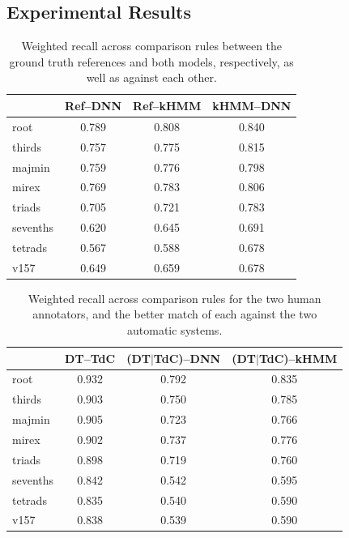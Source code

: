 \documentclass{article}
\begin{document}
\subsection{Experimental Results}
\label{subsec:experiment}

\begin{table}[!t]
\small
\centering
\begin{tabular}{l||ccc}
          & Ref--DNN & Ref--kHMM & kHMM--DNN \\
\hline
root      & 0.789      & 0.808       & 0.840       \\
thirds    & 0.757      & 0.775       & 0.815       \\
majmin    & 0.759      & 0.776       & 0.798       \\
mirex     & 0.769      & 0.783       & 0.806       \\
triads    & 0.705      & 0.721       & 0.783       \\
sevenths  & 0.620      & 0.645       & 0.691       \\
tetrads   & 0.567      & 0.588       & 0.678       \\
v157      & 0.649      & 0.659       & 0.678       \\
\hline
\end{tabular}
\caption{Weighted recall across comparison rules between the ground truth references and both models, respectively, as well as against each other.}
\label{tab:test_performance}
\end{table}

\begin{table}[!t]
\small
\centering
\begin{tabular}{l||ccc}
            & DT--TdC & (DT$|$TdC)--DNN & (DT$|$TdC)--kHMM \\
\hline
root        & 0.932 & 0.792 & 0.835 \\
thirds      & 0.903 & 0.750 & 0.785 \\
majmin      & 0.905 & 0.723 & 0.766 \\
mirex       & 0.902 & 0.737 & 0.776 \\
triads      & 0.898 & 0.719 & 0.760 \\
sevenths    & 0.842 & 0.542 & 0.595 \\
tetrads     & 0.835 & 0.540 & 0.590 \\
v157        & 0.838 & 0.539 & 0.590 \\
\hline
\end{tabular}
\caption{Weighted recall across comparison rules for the two human annotators, and the better match of each against the two automatic systems.}
\label{tab:rc_performance}
\end{table}
\end{document}
